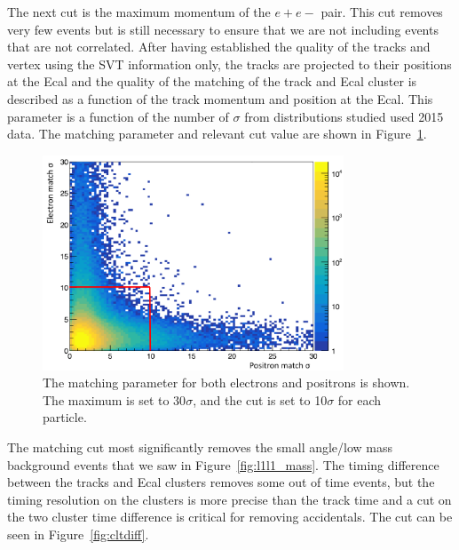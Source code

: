 The next cut is the maximum momentum of the $e+e-$ pair. This cut removes very few events but is still necessary to ensure that we are not including events that are not correlated. After having established the quality of the tracks and vertex using the SVT information only, the tracks are projected to their positions at the Ecal and the quality of the matching of the track and Ecal cluster is described as a function of the track momentum and position at the Ecal. This parameter is a function of the number of $\sigma$ from distributions studied used 2015 data. The matching parameter and relevant cut value are shown in Figure~\ref{fig:matchcut}. 

\begin{figure}[H]
  \centering
      \includegraphics[width=0.8\textwidth]{pics/searching/matchcut.png}
  \caption{The matching parameter for both electrons and positrons is shown. The maximum is set to 30$\sigma$, and the cut is set to 10$\sigma$ for each particle.}
  \label{fig:matchcut}
\end{figure} 

The matching cut most significantly removes the small angle/low mass background events that we saw in Figure~\ref{fig:l1l1_mass}. The timing difference between the tracks and Ecal clusters removes some out of time events, but the timing resolution on the clusters is more precise than the track time and a cut on the two cluster time difference is critical for removing accidentals. The cut can be seen in Figure~\ref{fig:cltdiff}.

